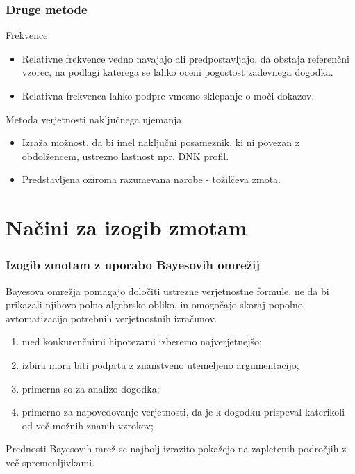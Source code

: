 \documentclass{beamer}
\begin{document}
\begin{frame}
   \frametitle{Druge metode}
   \begin{block}{Frekvence}
      \begin{itemize}
         \item Relativne frekvence vedno navajajo ali predpostavljajo, da obstaja referenčni vzorec, na podlagi katerega se lahko oceni pogostost zadevnega dogodka.
         \item Relativna frekvenca lahko podpre vmesno sklepanje o moči dokazov.
      \end{itemize}
   \end{block} \vspace{2mm}
   \begin{block}{Metoda verjetnosti naključnega ujemanja}
      \begin{itemize}
         \item Izraža možnost, da bi imel naključni posameznik, ki ni povezan z obdolžencem, ustrezno lastnost npr. DNK profil.
         \item Predstavljena oziroma razumevana narobe - tožilčeva zmota.
      \end{itemize}
   \end{block}
\end{frame}

\section{Načini za izogib zmotam}

\begin{frame}
   \frametitle{Izogib zmotam z uporabo Bayesovih omrežij}
   \begin{block}{}
       Bayesova omrežja pomagajo določiti ustrezne verjetnostne formule, ne da bi prikazali njihovo polno algebrsko obliko, in omogočajo skoraj popolno avtomatizacijo potrebnih verjetnostnih izračunov.
   \end{block} \vspace{3mm}
   \begin{enumerate}
       \item med konkurenčnimi hipotezami izberemo najverjetnejšo;
       \item izbira mora biti podprta z znanstveno utemeljeno argumentacijo;
       \item primerna so za analizo dogodka;
       \item primerno za napovedovanje verjetnosti, da je k dogodku prispeval katerikoli od več možnih znanih vzrokov;
   \end{enumerate}
   \begin{block}{}
       Prednosti Bayesovih mrež se najbolj izrazito pokažejo na zapletenih področjih z več spremenljivkami.
   \end{block}
\end{frame}
\end{document}
